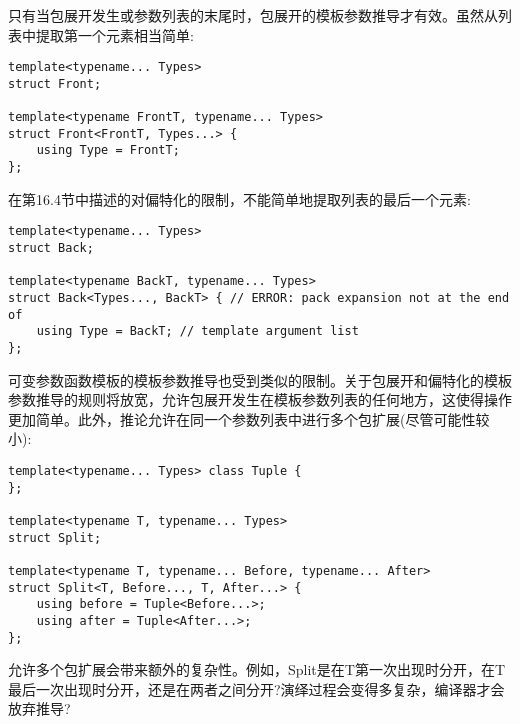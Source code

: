 只有当包展开发生或参数列表的末尾时，包展开的模板参数推导才有效。虽然从列表中提取第一个元素相当简单:

\begin{lstlisting}[style=styleCXX]
template<typename... Types>
struct Front;

template<typename FrontT, typename... Types>
struct Front<FrontT, Types...> {
	using Type = FrontT;
};
\end{lstlisting}

在第16.4节中描述的对偏特化的限制，不能简单地提取列表的最后一个元素:

\begin{lstlisting}[style=styleCXX]
template<typename... Types>
struct Back;

template<typename BackT, typename... Types>
struct Back<Types..., BackT> { // ERROR: pack expansion not at the end of
	using Type = BackT; // template argument list
};
\end{lstlisting}

可变参数函数模板的模板参数推导也受到类似的限制。关于包展开和偏特化的模板参数推导的规则将放宽，允许包展开发生在模板参数列表的任何地方，这使得操作更加简单。此外，推论允许在同一个参数列表中进行多个包扩展(尽管可能性较小):

\begin{lstlisting}[style=styleCXX]
template<typename... Types> class Tuple {
};

template<typename T, typename... Types>
struct Split;

template<typename T, typename... Before, typename... After>
struct Split<T, Before..., T, After...> {
	using before = Tuple<Before...>;
	using after = Tuple<After...>;
};
\end{lstlisting}

允许多个包扩展会带来额外的复杂性。例如，Split是在T第一次出现时分开，在T最后一次出现时分开，还是在两者之间分开?演绎过程会变得多复杂，编译器才会放弃推导?













































